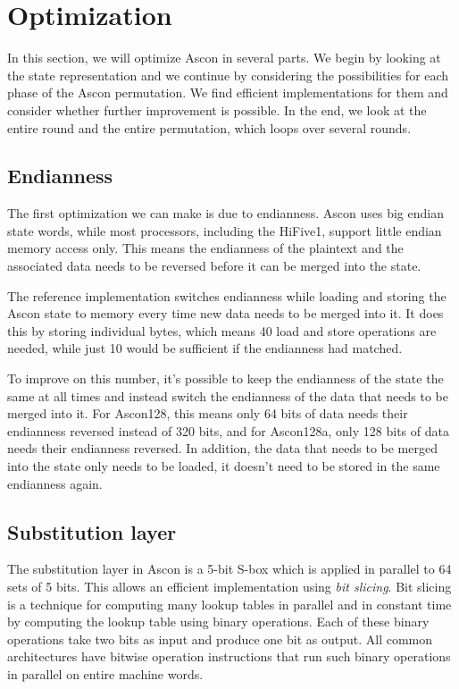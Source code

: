 \section{Optimization}

In this section, we will optimize Ascon in several parts. We begin by looking at
the state representation and we continue by considering the possibilities for
each phase of the Ascon permutation. We find efficient implementations for them
and consider whether further improvement is possible. In the end, we look at the
entire round and the entire permutation, which loops over several rounds.

\subsection{Endianness}

The first optimization we can make is due to endianness. Ascon uses big endian
state words, while most processors, including the HiFive1, support little endian
memory access only. This means the endianness of the plaintext and the
associated data needs to be reversed before it can be merged into the state.

The reference implementation switches endianness while loading and storing the
Ascon state to memory every time new data needs to be merged into it. It does
this by storing individual bytes, which means 40 load and store operations are
needed, while just 10 would be sufficient if the endianness had matched.

To improve on this number, it's possible to keep the endianness of the state the
same at all times and instead switch the endianness of the data that needs to be
merged into it. For Ascon128, this means only 64 bits of data needs their
endianness reversed instead of 320 bits, and for Ascon128a, only 128 bits of
data needs their endianness reversed. In addition, the data that needs to be
merged into the state only needs to be loaded, it doesn't need to be stored in
the same endianness again.

\subsection{Substitution layer}

The substitution layer in Ascon is a 5-bit S-box which is applied in parallel to
64 sets of 5 bits. This allows an efficient implementation using
\emph{bit slicing}. Bit slicing is a technique for computing many lookup tables
in parallel and in constant time by computing the lookup table using binary
operations. Each of these binary operations take two bits as input and produce
one bit as output. All common architectures have bitwise operation instructions
that run such binary operations in parallel on entire machine words.

